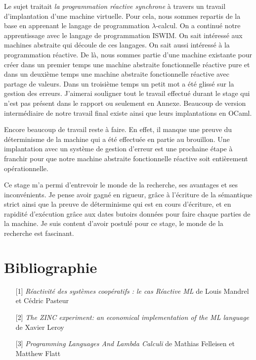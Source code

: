 \documentclass[10pt,a4paper]{report}
\begin{document}
Le sujet traitait \textit{la programmation réactive synchrone} à travers un travail d'implantation d'une machine virtuelle. Pour cela, nous sommes repartis de la base en apprenant le langage de programmation $\lambda$-calcul. On a continué notre apprentissage avec le langage de programmation ISWIM. On sait intéressé aux machines abstraite qui découle de ces langages. On sait aussi intéressé à la programmation réactive. De là, nous sommes partie d'une machine existante pour créer dans un premier temps une machine abstraite fonctionnelle réactive pure et dans un deuxième temps une machine abstraite fonctionnelle réactive avec partage de valeurs. Dans un troisième temps un petit mot a été glissé sur la gestion des erreurs. J'aimerai souligner tout le travail effectué durant le stage qui n'est pas présent dans le rapport ou seulement en Annexe. Beaucoup de version intermédiaire de notre travail final existe ainsi que leurs implantations en OCaml. 
\medbreak

Encore beaucoup de travail reste à faire. En effet, il manque une preuve du déterminisme de la machine qui a été effectuée en partie au brouillon. Une implantation avec un système de gestion d'erreur est une prochaine étape à franchir pour que notre machine abstraite fonctionnelle réactive soit entièrement opérationnelle.
\medbreak

Ce stage m'a permi d'entrevoir le monde de la recherche, ses avantages et ses inconvénients. Je pense avoir gagné en rigueur, grâce à l'écriture de la sémantique strict ainsi que la preuve de déterminisme qui est en cours d'écriture, et en rapidité d'exécution grâce aux dates butoirs données pour faire chaque parties de la machine. Je suis content d'avoir postulé pour ce stage, le monde de la recherche est fascinant.
\newpage



\chapter*{Bibliographie}

\begin{itemize}
\item[] [1] \textit{Réactivité des systèmes coopératifs : le cas Réactive ML} de Louis Mandrel et Cédric Pasteur\label{ReactiveML}
\item[] [2] \textit{The ZINC experiment: an economical implementation of the ML language} de Xavier Leroy\label{ZINC}
\item[] [3] \textit{Programming Languages And Lambda Calculi} de Mathias Felleisen et Matthew Flatt\label{Calculi}
\end{itemize}
\end{document}
